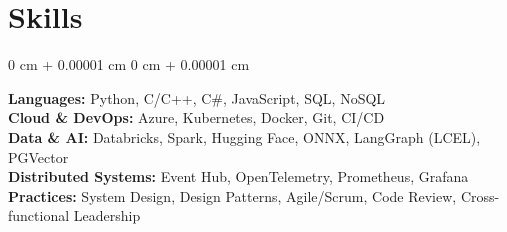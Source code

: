 \documentclass[10pt, letterpaper]{article}
\newenvironment{onecolentry}{
    \begin{adjustwidth}{
        0 cm + 0.00001 cm
    }{
        0 cm + 0.00001 cm
    }
}{
    \end{adjustwidth}
} %
\begin{document}


    
    
    
    
    
    
    
    

\section{Skills}
\begin{onecolentry}
\textbf{Languages:} Python, C/C++, C\#, JavaScript, SQL, NoSQL \\
\textbf{Cloud \& DevOps:} Azure, Kubernetes, Docker, Git, CI/CD \\
\textbf{Data \& AI:} Databricks, Spark, Hugging Face, ONNX, LangGraph (LCEL), PGVector \\
\textbf{Distributed Systems:} Event Hub, OpenTelemetry, Prometheus, Grafana \\
\textbf{Practices:} System Design, Design Patterns, Agile/Scrum, Code Review, Cross-functional Leadership
\end{onecolentry}
\end{document}
